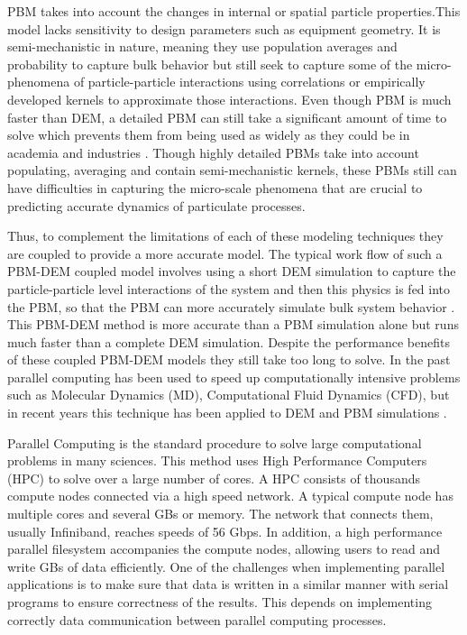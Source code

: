 \documentclass[preprint,11pt,authoryear]{elsarticle}
\begin{document}
PBM takes into account the changes in internal or spatial particle properties.This 
model lacks sensitivity to design parameters such as equipment geometry. It is semi-mechanistic in 
nature, meaning they use population averages and probability to capture bulk behavior but still 
seek to capture some of the micro-phenomena of particle-particle interactions using correlations or 
empirically developed kernels to approximate those interactions. Even though PBM is much faster 
than DEM, a detailed PBM can still take a significant amount of time to solve which prevents them 
from being used as widely as they could be in academia and industries \citep{Barrasso2013}. Though highly 
detailed PBMs take into account populating, averaging and contain semi-mechanistic kernels, these 
PBMs still can have difficulties in capturing the micro-scale phenomena that are crucial to 
predicting accurate dynamics of particulate processes. 

Thus, to complement the limitations of each of these modeling techniques they are coupled to 
provide a more accurate model.  The typical work flow of such a PBM-DEM coupled model involves 
using a short DEM simulation to capture the particle-particle level interactions of the system and 
then this physics is fed into the PBM, so that the PBM can more accurately simulate bulk system 
behavior \citep{Goldschmidt2003} \citep{Reinhold2012}\citep{Barrasso2013}. This PBM-DEM 
method is more accurate than a PBM simulation alone but runs much faster than a complete DEM 
simulation. Despite the performance benefits of these coupled PBM-DEM models they still take too 
long to solve. In the past parallel computing has been used to speed up computationally intensive 
problems such as Molecular Dynamics (MD), Computational Fluid Dynamics (CFD), but in recent 
years  this technique has been applied to DEM and PBM simulations 
\citep{Bettencourt2017}\citep{Prakash2013a}\citep{Gunawan2008}.


Parallel Computing is the standard procedure to solve large computational problems in many sciences. 
This method uses High Performance Computers (HPC) to solve over a large number of cores. 
A HPC consists of thousands compute nodes connected via a high speed network. A typical compute 
node has multiple cores and several GBs or memory. The network that connects them, usually Infiniband, 
reaches speeds of 56 Gbps. In addition, a high performance parallel filesystem accompanies the compute 
nodes, allowing users to read and write GBs of data efficiently. One of the challenges when implementing 
parallel applications is to make sure that data is written in a similar manner with serial programs 
to ensure correctness of the results. This depends on implementing correctly data communication 
between parallel computing processes. 
\end{document}
